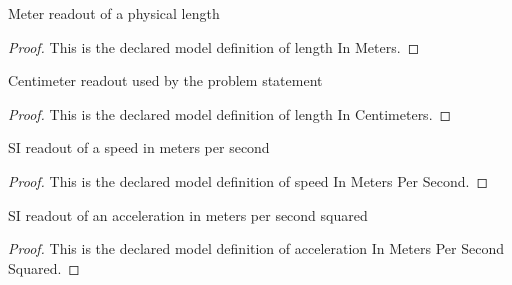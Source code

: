\begin{definition}
  \label{def:physics:phyx-mini-0779:phyxminiproblems-problemphyxmini0779-lengthinmeters}
  Meter readout of a physical length
\end{definition}
\begin{proof}
  This is the declared model definition of length In Meters.
\end{proof}
\begin{definition}
  \label{def:physics:phyx-mini-0779:phyxminiproblems-problemphyxmini0779-lengthincentimeters}
  Centimeter readout used by the problem statement
\end{definition}
\begin{proof}
  This is the declared model definition of length In Centimeters.
\end{proof}
\begin{definition}
  \label{def:physics:phyx-mini-0779:phyxminiproblems-problemphyxmini0779-speedinmeterspersecond}
  SI readout of a speed in meters per second
\end{definition}
\begin{proof}
  This is the declared model definition of speed In Meters Per Second.
\end{proof}
\begin{definition}
  \label{def:physics:phyx-mini-0779:phyxminiproblems-problemphyxmini0779-accelerationinmeterspersecondsquared}
  SI readout of an acceleration in meters per second squared
\end{definition}
\begin{proof}
  This is the declared model definition of acceleration In Meters Per Second Squared.
\end{proof}
